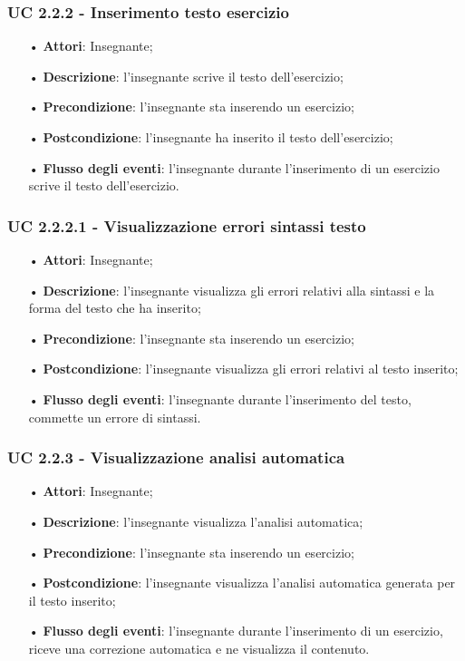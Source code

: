 \subsubsection{UC 2.2.2 - Inserimento testo esercizio}
\begin{itemize}
	\item[•] \textbf{Attori}: Insegnante;
	\item[•] \textbf{Descrizione}: l'insegnante scrive il testo dell'esercizio;
	\item[•] \textbf{Precondizione}: l'insegnante sta inserendo un esercizio;
	\item[•] \textbf{Postcondizione}: l'insegnante ha inserito il testo dell'esercizio;
	\item[•] \textbf{Flusso degli eventi}: l'insegnante durante l'inserimento di un esercizio scrive il testo dell'esercizio.
\end{itemize}

\subsubsection{UC 2.2.2.1 - Visualizzazione errori sintassi testo}
\begin{itemize}
	\item[•] \textbf{Attori}: Insegnante;
	\item[•] \textbf{Descrizione}: l'insegnante visualizza gli errori relativi alla sintassi e la forma del testo che ha inserito;
	\item[•] \textbf{Precondizione}: l'insegnante sta inserendo un esercizio;
	\item[•] \textbf{Postcondizione}: l'insegnante visualizza gli errori relativi al testo inserito;
	\item[•] \textbf{Flusso degli eventi}: l'insegnante durante l'inserimento del testo, commette un errore di sintassi.
\end{itemize}

\subsubsection{UC 2.2.3 - Visualizzazione analisi automatica} 
\begin{itemize}
	\item[•] \textbf{Attori}: Insegnante;
	\item[•] \textbf{Descrizione}: l'insegnante visualizza l'analisi automatica;
	\item[•] \textbf{Precondizione}: l'insegnante sta inserendo un esercizio;
	\item[•] \textbf{Postcondizione}: l'insegnante visualizza l'analisi automatica generata per il testo inserito;
	\item[•] \textbf{Flusso degli eventi}: l'insegnante durante l'inserimento di un esercizio, riceve una correzione automatica e ne visualizza il contenuto.
\end{itemize}



